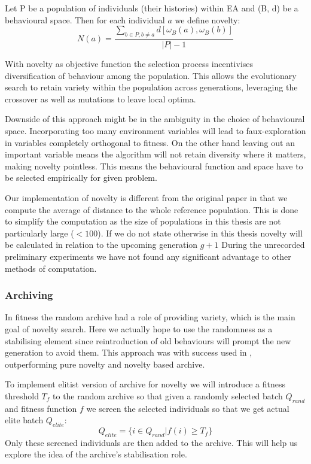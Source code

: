 \begin{defn}
\label{def:novetly}
Let P be a population of individuals (their histories) within EA and (B, d) be a behavioural space. Then for each individual $ a $ we define novelty:  $$ N(a) =\frac{\sum_{b\in P, b\neq a}d\left[\omega_B(a),\omega_B(b)\right]}{|P|-1} $$ 
\end{defn}

With novelty as objective function the selection process incentivises diversification of behaviour among the population. This allows the evolutionary search to retain variety within the population across generations, leveraging the crossover as well as mutations to leave local optima.

Downside of this approach might be in the ambiguity in the choice of behavioural space. Incorporating too many environment variables will lead to faux-exploration in variables completely orthogonal to fitness. On the other hand leaving out an important variable means the algorithm will not retain diversity where it matters, making novelty pointless. This means the behavioural function and space have to be selected empirically for given problem.

Our implementation of novelty is different from the original paper in that we compute the average of distance to the whole reference population. This is done to simplify the computation as the size of populations in this thesis are not particularly large ($< 100$).
If we do not state otherwise in this thesis novelty will be calculated in relation to the upcoming generation $ g+1 $ During the unrecorded preliminary experiments we have not found any significant advantage to other methods of computation.


\subsubsection{Archiving}
In fitness the random archive had a role of providing variety, which is the main goal of novelty search. Here we actually hope to use the randomness as a stabilising element since reintroduction of old behaviours will prompt the new generation to avoid them. This approach was with success used in \cite{noveltyEmpirical}, outperforming pure novelty and novelty based archive.

To implement elitist version of archive for novelty we will introduce a  fitness threshold $ T_{f} $ to the random archive so that given a randomly selected batch $ Q_{rand} $ and fitness function $ f $ we screen the selected individuals so that we get actual elite batch $ Q_{elite} $: 
$$ 
Q_{elite} = \{i \in Q_{rand}|f(i) \ge T_f\} 
$$
Only these screened individuals are then added to the archive. This will help us explore the idea of the archive's stabilisation role.
